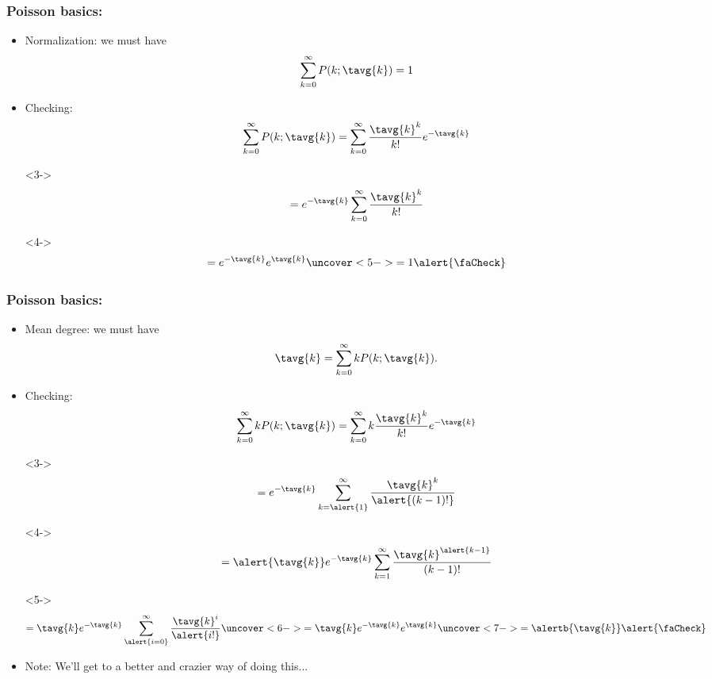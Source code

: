 \begin{frame}[label=]
  \frametitle{Poisson basics:}

  \begin{itemize}
  \item<1-> 
    Normalization: we must have
    $$ 
    \sum_{k=0}^\infty
    P(k;\tavg{k})
    = 1
    $$
  \item<2->
    Checking:
    $$ 
    \sum_{k=0}^\infty
    P(k;\tavg{k})
    =
    \sum_{k=0}^\infty
    \frac{\tavg{k}^k}
    {k!}
    e^{-\tavg{k}}
    $$
  \item[]<3->
    $$
    =
    e^{-\tavg{k}}
    \sum_{k=0}^\infty
    \frac{\tavg{k}^k}
    {k!}
    $$
  \item[]<4->
    $$
    =
    e^{-\tavg{k}}
    e^{\tavg{k}}
    \uncover<5->{
      =
      1
      \alert{\faCheck}
    }
    $$
  \end{itemize}

\end{frame}


\begin{frame}[label=]
  \frametitle{Poisson basics:}

  \small
  \begin{itemize}
  \item<1-> Mean degree: we must have
    $$
    \tavg{k}
    =
    \sum_{k=0}^\infty
    k
    P(k;\tavg{k}).
    $$
  \item<2->
    Checking:
    $$ 
    \sum_{k=0}^\infty
    k P(k;\tavg{k})
    =
    \sum_{k=0}^\infty
    k \frac{\tavg{k}^k}
    {k!}
    e^{-\tavg{k}}
    $$
  \item[]<3->
    $$
    = e^{-\tavg{k}}
    \sum_{k=\alert{1}}^\infty
    \frac{\tavg{k}^k}
    {\alert{(k-1)!}}
    $$
  \item[]<4->
    $$
    = 
    \alert{\tavg{k}}
    e^{-\tavg{k}}
    \sum_{k={1}}^\infty
    \frac{\tavg{k}^{\alert{k-1}}}
    {{(k-1)!}}
    $$
  \item[]<5->
    $$
    = 
    \tavg{k}
    e^{-\tavg{k}}
    \sum_{\alert{i=0}}^\infty
    \frac{\tavg{k}^{i}}
    {\alert{i!}}
    \uncover<6->{
      =
      \tavg{k}
    e^{-\tavg{k}}
    e^{\tavg{k}}
    }
    \uncover<7->{
      =
      \alertb{\tavg{k}}
      \alert{\faCheck}
    }
    $$
  \item<8->
    Note: We'll get to a better and crazier way of doing this...
  \end{itemize}

\end{frame}

